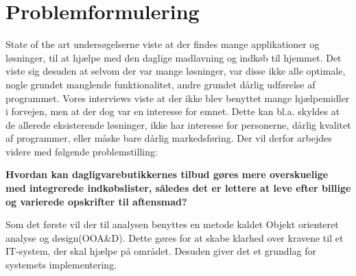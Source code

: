\chapter{Problemformulering}

State of the art undersøgelserne viste at der findes mange applikationer og løsninger, til at hjælpe med den daglige madlavning og indkøb til hjemmet. 
Det viste sig desuden at selvom der var mange løsninger, var disse ikke alle optimale, nogle grundet manglende funktionalitet, andre grundet dårlig udførelse af programmet. 
Vores interviews viste at der ikke blev benyttet mange hjælpemidler i forvejen, men at der dog var en interesse for emnet.
Dette kan bl.a. skyldes at de allerede eksisterende løsninger, ikke har interesse for personerne, dårlig kvalitet af programmer, eller måske bare dårlig markedsføring. Der vil derfor arbejdes videre med følgende problemstilling:

\textbf{Hvordan kan dagligvarebutikkernes tilbud gøres mere overskuelige med integrerede indkøbslister, således det er lettere at leve efter billige og varierede opskrifter til aftensmad?}

Som det første vil der til analysen benyttes en metode kaldet Objekt orienteret analyse og design(OOA\&D).
Dette gøres for at skabe klarhed over kravene til et IT-system, der skal hjælpe på området.
Desuden giver det et grundlag for systemets implementering. 